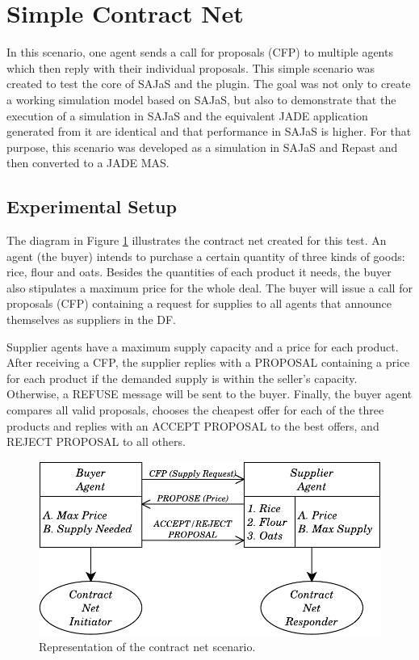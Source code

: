\section{Simple Contract Net}

In this scenario, one agent sends a call for proposals (CFP) to multiple agents which then reply with their individual proposals. This simple scenario was created to test the core of SAJaS and the plugin. The goal was not only to create a working simulation model based on SAJaS, but also to demonstrate that the execution of a simulation in SAJaS and the equivalent JADE application generated from it are identical and that performance in SAJaS is higher. For that purpose, this scenario was developed as a simulation in SAJaS and Repast and then converted to a JADE MAS.

\subsection{Experimental Setup}

The diagram in Figure \ref{fig:CNetExample} illustrates the contract net created for this test. An agent (the buyer) intends to purchase a certain quantity of three kinds of goods: rice, flour and oats. Besides the quantities of each product it needs, the buyer also stipulates a maximum price for the whole deal. The buyer will issue a call for proposals (CFP) containing a request for supplies to all agents that announce themselves as suppliers in the DF.

Supplier agents have a maximum supply capacity and a price for each product. After receiving a CFP, the supplier replies with a PROPOSAL containing a price for each product if the demanded supply is within the seller's capacity. Otherwise, a REFUSE message will be sent to the buyer.
Finally, the buyer agent compares all valid proposals, chooses the cheapest offer for each of the three products and replies with an ACCEPT PROPOSAL to the best offers, and REJECT PROPOSAL to all others.

\begin{figure}[h]
	\centering
	\includegraphics[width=0.60\linewidth]{figures/CNetExample.pdf}
	\caption{Representation of the contract net scenario.}
	\label{fig:CNetExample}
\end{figure}

